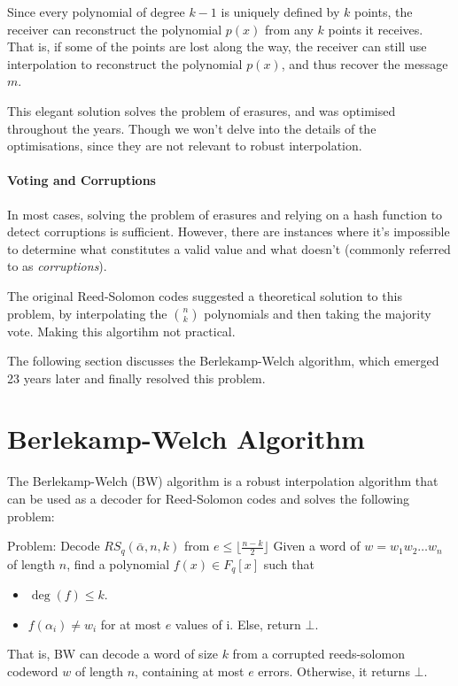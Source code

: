 Since every polynomial of degree $k-1$ is uniquely defined by $k$ points,
the receiver can reconstruct the polynomial $p(x)$ from any $k$ points it receives.
That is, if some of the points are lost along the way, the receiver can still
use interpolation to reconstruct the polynomial $p(x)$, and thus recover the message $m$.

This elegant solution solves the problem of erasures, and was optimised throughout the 
years. Though we won't delve into the details of the optimisations, since they 
are not relevant to robust interpolation.


\paragraph{Voting and Corruptions}
    In most cases, solving the problem of erasures and relying on a hash 
    function to detect corruptions is sufficient. However, there are instances 
    where it's impossible to determine what constitutes a valid value 
    and what doesn't (commonly referred to as \emph{corruptions}).

    The original Reed-Solomon codes suggested a theoretical solution
    to this problem, by interpolating the $\binom{n}{k}$ polynomials
    and then taking the majority vote.
    Making this algortihm not practical.

    The following section discusses the Berlekamp-Welch algorithm,
    which emerged 23 years later and finally resolved this problem.

\section{Berlekamp-Welch Algorithm}
The Berlekamp-Welch (BW) algorithm is a robust interpolation algorithm that
can be used as a decoder for Reed-Solomon codes and solves the following problem:

\begin{bclogo}[logo=\bcattention,noborder=true]{Problem: Decode 
    $RS_q(\bar{\alpha},n,k)$ from $e\le \lfloor\frac{n-k}{2}\rfloor$}
Given a word of $w=w_1w_2\dots w_n$ of length $n$, 
find a polynomial $f(x)\in F_q[x]$ such that
\begin{itemize}
    \item $\deg(f)\le k$.
    \item $f(\alpha_i)\ne w_i$ for at most $e$ values of i. Else, return $\bot$.
\end{itemize}

\end{bclogo}
That is, BW can decode a word of size $k$ from a corrupted reeds-solomon 
codeword $w$ of length $n$, containing at most $e$ errors. Otherwise, it returns $\bot$.

